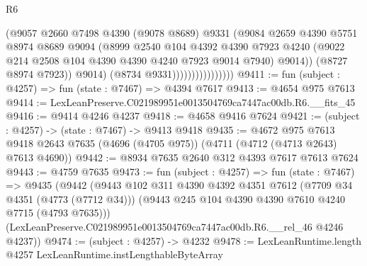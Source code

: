 \begin{lexlean}{R6}
\begin{coremodule}
                                    (@9057
                                      @2660
                                      @7498
                                      @4390
                                      (@9078 @8689)
                                      @9331
                                      (@9084
                                        @2659
                                        @4390
                                        @5751
                                        @8974
                                        @8689
                                        @9094
                                        (@8999
                                          @2540
                                          @104
                                          @4392
                                          @4390
                                          @7923
                                          @4240
                                          (@9022
                                            @214
                                            @2508
                                            @104
                                            @4390
                                            @4390
                                            @4240
                                            @7923
                                            @9014
                                            @7940)
                                          @9014))
                                      (@8727 @8974 @7923))
                                    @9014)
                                  (@8734 @9331))))))))))))))))
@9411 := fun (subject : @4257) => fun (state : @7467) => @4394 @7617
@9413 := @4654 @975 @7613
@9414 := LexLeanPreserve.C021989951e0013504769ca7447ac00db.R6.__fits_45
@9416 := @9414 @4246 @4237
@9418 := @4658 @9416 @7624
@9421 := (subject : @4257) -> (state : @7467) -> @9413 @9418
@9435 := @4672
    @975
    @7613
    @9418
    @2643
    @7635
    (@4696 (@4705 @975))
    (@4711 (@4712 (@4713 @2643) @7613 @4690))
@9442 := @8934 @7635 @2640 @312 @4393 @7617 @7613 @7624
@9443 := @4759 @7635
@9473 := fun (subject : @4257) =>
  fun (state : @7467) =>
  @9435
    (@9442
      (@9443
        @102
        @311
        @4390
        @4392
        @4351
        @7612
        (@7709 @34 @4351 (@4773 (@7712 @34)))
        (@9443 @245 @104 @4390 @4390 @7610 @4240 @7715 (@4793 @7635)))
      (LexLeanPreserve.C021989951e0013504769ca7447ac00db.R6.__rel_46 @4246 @4237))
@9474 := (subject : @4257) -> @4232
@9478 := LexLeanRuntime.length @4257 LexLeanRuntime.instLengthableByteArray

\end{coremodule}
\end{lexlean}
